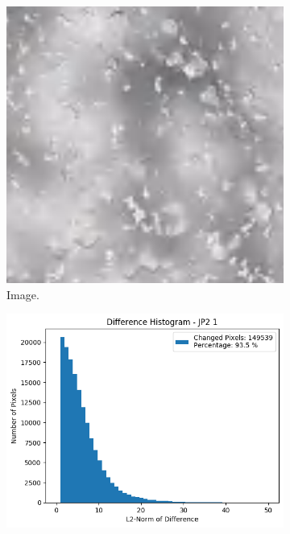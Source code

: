 \begin{figure}[htb]
    \centering
    \begin{subfigure}[b]{0.48\textwidth}
        \centering
        \includegraphics[width=\textwidth]{doc/thesis/0_figures/compare_quality/set1/jp2_1_center.png}
        \caption{Image.}
        \label{fig:img_quality_comp_jp2_1_center_orig}
    \end{subfigure}
    \begin{subfigure}[b]{0.48\textwidth}
        \centering
        \includegraphics[width=\textwidth]{doc/thesis/0_figures/compare_quality/set1/jp2_1_center_diff_histogram.png}

\end{subfigure}
\end{figure}
